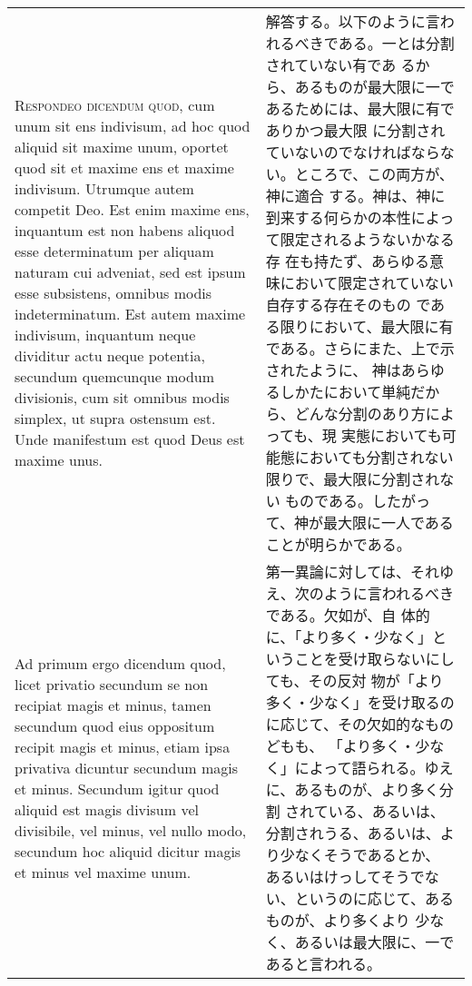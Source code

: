 \documentclass[10pt]{jsarticle} %
\begin{document}
\begin{longtable}{p{21em}p{21em}}
\\


{\scshape Respondeo dicendum quod}, cum unum sit ens indivisum, ad hoc quod
aliquid sit maxime unum, oportet quod sit et maxime ens et maxime
indivisum. Utrumque autem competit Deo. Est enim maxime ens, inquantum
est non habens aliquod esse determinatum per aliquam naturam cui
adveniat, sed est ipsum esse subsistens, omnibus modis
indeterminatum. Est autem maxime indivisum, inquantum neque dividitur
actu neque potentia, secundum quemcunque modum divisionis, cum sit
omnibus modis simplex, ut supra ostensum est. Unde manifestum est quod
Deus est maxime unus.

&

解答する。以下のように言われるべきである。一とは分割されていない有であ
るから、あるものが最大限に一であるためには、最大限に有でありかつ最大限
に分割されていないのでなければならない。ところで、この両方が、神に適合
する。神は、神に到来する何らかの本性によって限定されるようないかなる存
 在も持たず、あらゆる意味において限定されていない自存する存在そのもの
である限りにおいて、最大限に有である。さらにまた、上で示されたように、
神はあらゆるしかたにおいて単純だから、どんな分割のあり方によっても、現
実態においても可能態においても分割されない限りで、最大限に分割されない
ものである。したがって、神が最大限に一人であることが明らかである。



\\



Ad primum ergo dicendum{\scshape } quod, licet privatio secundum se non
recipiat magis et minus, tamen secundum quod eius oppositum recipit
magis et minus, etiam ipsa privativa dicuntur secundum magis et
minus. Secundum igitur quod aliquid est magis divisum vel divisibile,
vel minus, vel nullo modo, secundum hoc aliquid dicitur magis et minus
vel maxime unum.

&

第一異論に対しては、それゆえ、次のように言われるべきである。欠如が、自
体的に、「より多く・少なく」ということを受け取らないにしても、その反対
物が「より多く・少なく」を受け取るのに応じて、その欠如的なものどもも、
「より多く・少なく」によって語られる。ゆえに、あるものが、より多く分割
されている、あるいは、分割されうる、あるいは、より少なくそうであるとか、
あるいはけっしてそうでない、というのに応じて、あるものが、より多くより
少なく、あるいは最大限に、一であると言われる。

\\


\end{longtable}
\end{document}
